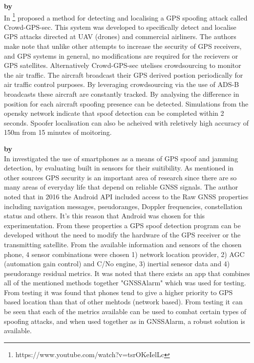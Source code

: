 \medskip

\textbf{\emph{} by \citeauthor{RN24}} \\
In \citeyear{RN24} \citeauthor{RN24} \cite{RN24} \footnote{https://www.youtube.com/watch?v=tsrOKeIelLc} proposed a method for detecting and localising
a GPS spoofing attack called Crowd-GPS-sec. This system was developed to specifically detect and localise GPS attacks directed at UAV (drones) and commercial
airliners. The authors make note that unlike other attempts to increase the security of GPS receivers, and GPS systems in general, no modifications are required
for the recievers or GPS satellites. Alternatively Crowd-GPS-sec utelises crowdsourcing to monitor the air traffic. The aircraft broadcast their GPS derived postion
periodically for air traffic control purposes. By leveraging crowdsourcing via the use of ADS-B broadcasts these aircraft are constantly tracked. 
By analysing the difference in position for each aircraft spoofing presence can be detected. Simulations from the opensky network indicate that spoof detection can be 
completed within 2 seconds. Spoofer localisation can also be acheived with reletively high accuracy of 150m from 15 minutes of moitoring.

\medskip

\textbf{\emph{} by \citeauthor{RN31}} \\
In \citeyear{RN31} \citeauthor{RN31} \cite{RN31} investigated the use of smartphones as a means of GPS spoof and jamming detection, by evaluating built in
sensors for their suitibility. As mentioned in other sources GPS security is an important area of research since there are so many areas of everyday life that depend on reliable GNSS signals.
The author noted that in 2016 the Android API included access to the Raw GNSS properties including navigation messages, pseudoranges,
Doppler frequencies, constellation status and others. It's this reason that Android was chosen for this experimentation. From these properties a GPS spoof detection program
can be developed without the need to modify the hardware of the GPS receiver or the transmitting satellite. 
From the available information and sensors of the chosen phone, 4 sensor combinations were chosen 1) network location provider, 2) AGC (automation gain control) and C/No engine,
3) inertial senesor data and 4) pseudorange residual metrics. It was noted that there exists an app that combines all of the mentioned methods together "GNSSAlarm" which was
used for testing. From testing it was found that phones tend to give a higher priority to GPS based location than that of other mehtods (network based). 
From testing it can be seen that each of the metrics available can be used to combat certain types of spoofing attacks, and when used together as in GNSSAlarm, 
a robust solution is available.

